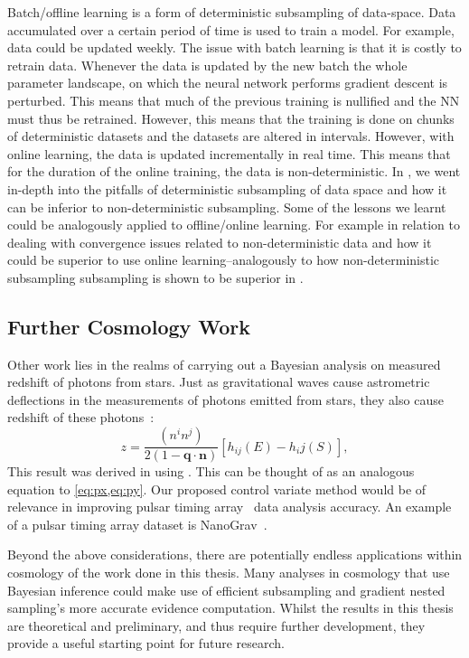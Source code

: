 Batch/offline learning is a form of deterministic subsampling of data-space. Data accumulated over a certain period of time is used to train a model. For example, data could be updated weekly. The issue with batch learning is that it is costly to retrain data. Whenever the data is updated by the new batch the whole parameter landscape, on which the neural network performs gradient descent is perturbed. This means that much of the previous training is nullified and the NN must thus be retrained. However, this means that the training is done on chunks of deterministic datasets and the datasets are altered in intervals. However, with online learning, the data is updated incrementally in real time. This means that for the duration of the online training, the data is non-deterministic. In , we went in-depth into the pitfalls of deterministic subsampling of data space and how it can be inferior to non-deterministic subsampling. Some of the lessons we learnt could be analogously applied to offline/online learning. For example in relation to dealing with convergence issues related to non-deterministic data and how it could be superior to use online learning--analogously to how non-deterministic subsampling subsampling is shown to be superior in .


\subsection{Further Cosmology Work}
Other work lies in the realms of carrying out a Bayesian analysis on measured redshift of photons from stars. Just as gravitational waves cause astrometric deflections in the measurements of photons emitted from stars, they also cause redshift of these photons~\cite{Mihaylov_2020}:
%
\begin{equation}
z=\frac{(n^{i} n^{j})}{2(1-\textbf{q} \cdot \textbf{n})}[h_{ij}(E)-h_ij(S)],
\end{equation}
%
This result was derived in \cite{Mihaylov_2020} using \cite{KAUFMANN1970}. This can be thought of as an analogous equation to \cref{eq:px,eq:py}. Our proposed control variate method would be of relevance in improving pulsar timing array~\cite{ 1975GReGr...6..439E} data analysis accuracy. An example of a pulsar timing array dataset is NanoGrav~\cite{McLaughlin_2013}. 

Beyond the above considerations, there are potentially endless applications within cosmology of the work done in this thesis. Many analyses in cosmology that use Bayesian inference could make use of efficient subsampling and gradient nested sampling's more accurate evidence computation. Whilst the results in this thesis are theoretical and preliminary, and thus require further development, they provide a useful starting point for future research.
